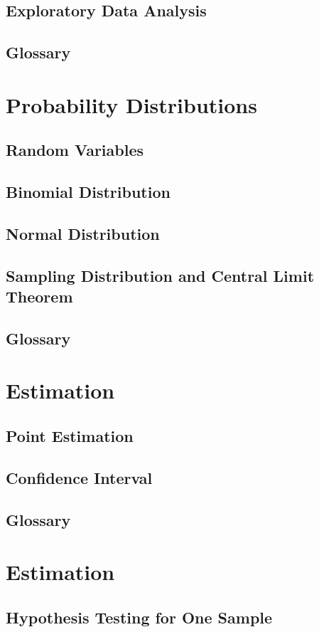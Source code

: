 \section{Exploratory Data Analysis}
 \section*{Glossary} 


\chapter{Probability Distributions}
\section{Random Variables}
\section{ Binomial Distribution}
\section{Normal Distribution}
\section{Sampling Distribution and Central Limit Theorem}
\section*{Glossary} 


\chapter{Estimation}
\section{Point Estimation}
\section{Confidence Interval}
\section*{Glossary} 

\chapter{Estimation}
\section{Hypothesis Testing for One Sample}
